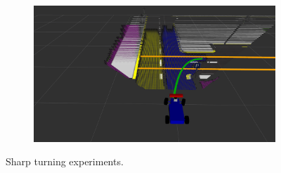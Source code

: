 \begin{figure}[h]
\begin{subfigure}[b]{0.45\linewidth}
  \end{subfigure}
  \begin{subfigure}[b]{0.45\linewidth}
      \includegraphics[width=\linewidth]{figures/experiments/parking-pc.png}
  \end{subfigure}
  \caption{Sharp turning experiments.}
  \label{figure:sharp-turns}
\end{figure}

